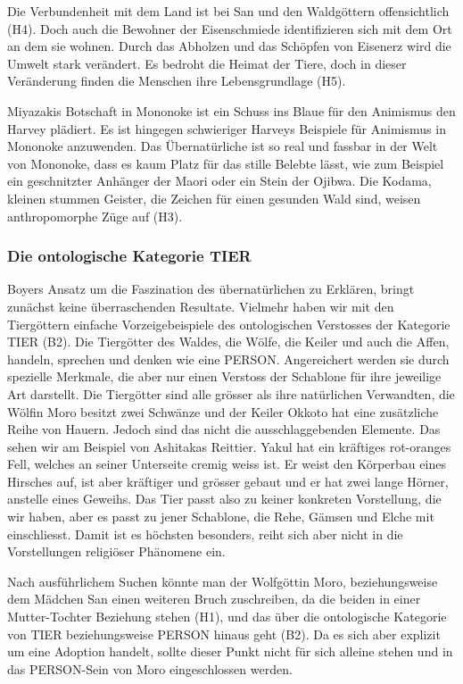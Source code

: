 Die Verbundenheit mit dem Land ist bei San und den Waldgöttern offensichtlich (H4). Doch auch die Bewohner der Eisenschmiede identifizieren sich mit dem Ort an dem sie wohnen. Durch das Abholzen und das Schöpfen von Eisenerz wird die Umwelt stark verändert. Es bedroht die Heimat der Tiere, doch in dieser Veränderung finden die Menschen ihre Lebensgrundlage (H5).

Miyazakis Botschaft in Mononoke ist ein Schuss ins Blaue für den Animismus den Harvey plädiert. Es ist hingegen schwieriger Harveys Beispiele für Animismus in Mononoke anzuwenden. Das Übernatürliche ist so real und fassbar in der Welt von Mononoke, dass es kaum Platz für das stille Belebte lässt, wie zum Beispiel ein geschnitzter Anhänger der Maori oder ein Stein der Ojibwa. Die Kodama, kleinen stummen Geister, die Zeichen für einen gesunden Wald sind, weisen anthropomorphe Züge auf (H3). 

\subsubsection{Die ontologische Kategorie TIER} 
Boyers Ansatz um die Faszination des übernatürlichen zu Erklären, bringt zunächst keine überraschenden Resultate. Vielmehr haben wir mit den Tiergöttern einfache Vorzeigebeispiele des ontologischen Verstosses der Kategorie TIER (B2). Die Tiergötter des Waldes, die Wölfe, die Keiler und auch die Affen, handeln, sprechen und denken wie eine PERSON. Angereichert werden sie durch spezielle Merkmale, die aber nur einen Verstoss der Schablone für ihre jeweilige Art darstellt. Die Tiergötter sind alle grösser als ihre natürlichen Verwandten, die Wölfin Moro besitzt zwei Schwänze und der Keiler Okkoto hat eine zusätzliche Reihe von Hauern. Jedoch sind das nicht die ausschlaggebenden Elemente. Das sehen wir am Beispiel von Ashitakas Reittier. Yakul hat ein kräftiges rot-oranges Fell, welches an seiner Unterseite cremig weiss ist. Er weist den Körperbau eines Hirsches auf, ist aber kräftiger und grösser gebaut und er hat zwei lange Hörner, anstelle eines Geweihs. Das Tier passt also zu keiner konkreten Vorstellung, die wir haben, aber es passt zu jener Schablone, die Rehe, Gämsen und Elche mit einschliesst. Damit ist es höchsten besonders, reiht sich aber nicht in die Vorstellungen religiöser Phänomene ein. 

Nach ausführlichem Suchen könnte man der Wolfgöttin Moro, beziehungsweise dem Mädchen San einen weiteren Bruch zuschreiben, da die beiden in einer Mutter-Tochter Beziehung stehen (H1), und das über die ontologische Kategorie von TIER beziehungsweise PERSON hinaus geht (B2). Da es sich aber explizit um eine Adoption handelt, sollte dieser Punkt nicht für sich alleine stehen und in das PERSON-Sein von Moro eingeschlossen werden. 

